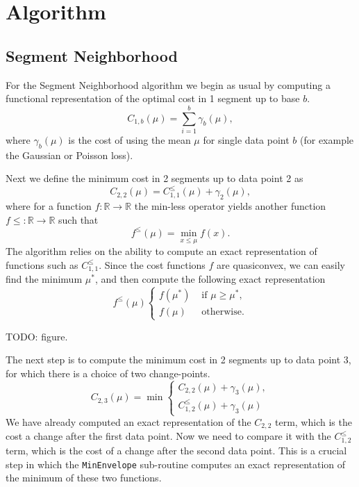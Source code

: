 \documentclass{article}
\newcommand{\RR}{\mathbb R}
\begin{document}
\section{Algorithm}

\subsection{Segment Neighborhood}

For the Segment Neighborhood algorithm we begin as usual by computing
a functional representation of the optimal cost in 1 segment up to
base $b$. 
\begin{equation*}
  \label{eq:C1b}
  C_{1,b}(\mu) = \sum_{i=1}^b \gamma_b(\mu),
\end{equation*}
where $\gamma_b(\mu)$ is the cost of using the mean $\mu$ for single
data point $b$ (for example the Gaussian or Poisson loss).

Next we define the minimum cost in 2 segments up to data point 2 as
\begin{equation*}
  \label{eq:C22}
  C_{2,2}(\mu) = C_{1,1}^{\leq}(\mu) + \gamma_2(\mu),
\end{equation*}
where for a function $f:\RR\rightarrow\RR$ the min-less operator
yields another function $f\leq:\RR\rightarrow\RR$ such that
\begin{equation}
  \label{eq:min-less}
  f^{\leq}(\mu) = \min_{x\leq \mu} f(x).
\end{equation}
The algorithm relies on the ability to compute an exact representation
of functions such as $C_{1,1}^{\leq}$. Since the cost functions $f$
are quasiconvex, we can easily find the minimum $\mu^*$, and then
compute the following exact representation
\begin{equation*}
  f^\leq(\mu)
  \begin{cases}
    f(\mu^*) & \text{ if } \mu \geq \mu^*,\\
    f(\mu) & \text{ otherwise.}
  \end{cases}
\end{equation*}

TODO: figure.

The next step is to compute the minimum cost in 2 segments up to data
point 3, for which there is a choice of two change-points.
\begin{equation*}
  C_{2,3}(\mu) = \min
  \begin{cases}
    C_{2,2}(\mu)+\gamma_3(\mu), \\
    C_{1,2}^{\leq}(\mu)+\gamma_3(\mu)
  \end{cases}
\end{equation*}
We have already computed an exact representation of the $C_{2,2}$
term, which is the cost a change after the first data point. Now we
need to compare it with the $C_{1,2}^{\leq}$ term, which is the cost
of a change after the second data point. This is a crucial step in
which the \texttt{MinEnvelope} sub-routine computes an exact
representation of the minimum of these two functions.
\end{document}
